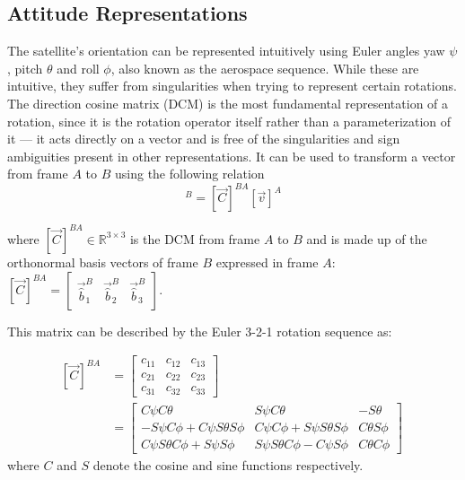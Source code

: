 \subsection{Attitude Representations}

The satellite's orientation can be represented intuitively using Euler angles yaw $\psi$, pitch $\theta$ and roll $\phi$, also known as the aerospace sequence. While these are intuitive, they suffer from singularities when trying to represent certain rotations. The direction cosine matrix (DCM) is the most fundamental representation of a rotation, since it is the rotation operator itself rather than a parameterization of it — it acts directly on a vector and is free of the singularities and sign ambiguities present in other representations. It can be used to transform a vector from frame $A$ to $B$ using the following relation
\begin{equation}
    [\vec{v}]^B = [\vec{C}]^{BA}[\vec{v}]^A
\end{equation}

where $[\vec{C}]^{BA} \in \mathbb{R}^{3 \times 3}$ is the DCM from frame $A$ to $B$ and is made up of the orthonormal basis vectors of frame $B$ expressed in frame $A$: $[\vec{C}]^{BA} = \begin{bmatrix} \vec{\hat{b}}_1^B & \vec{\hat{b}}_2^B & \vec{\hat{b}}_3^B\end{bmatrix}$.

This matrix can be described by the Euler 3-2-1 rotation sequence as:

\begin{align*}
    [\vec{C}]^{BA} &= \begin{bmatrix}
        c_{11} & c_{12} & c_{13} \\
        c_{21} & c_{22} & c_{23} \\
        c_{31} & c_{32} & c_{33}
    \end{bmatrix} \\
    &= \begin{bmatrix}
        C \psi C \theta &  S\psi C \theta & - S \theta \\
        - S \psi C \phi + C \psi S \theta S \phi & C \psi C \phi +  S\psi S \theta S \phi & C \theta S \phi \\
        C \psi S \theta C \phi + S \psi S \phi & S \psi S \theta C \phi - C \psi S \phi & C \theta C \phi
    \end{bmatrix} \
\end{align*}
where $C$ and $S$ denote the cosine and sine functions respectively.

